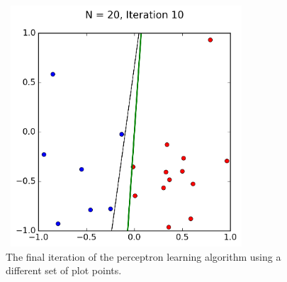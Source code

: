 \documentclass[a4paper]{article}
\begin{document}
\begin{figure}
  \includegraphics[width=9cm,height=9cm]{p_N20_it10.png}
  \caption{The final iteration of the perceptron learning algorithm using a different set of plot points.}
  \label{fig:PartC3}
\end{figure}
\end{document}
